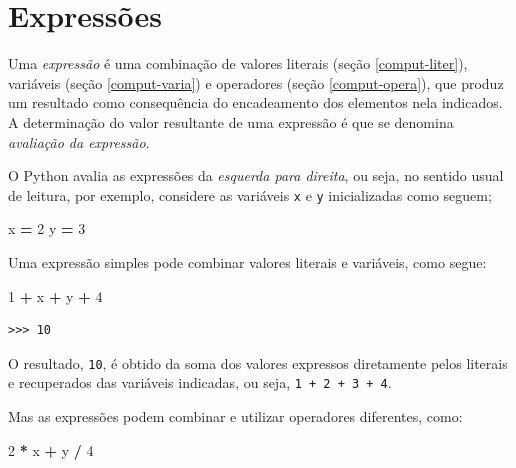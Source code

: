\documentclass[
]{book}
\newenvironment{Shaded}{\begin{snugshade}}{\end{snugshade}}
\newcommand{\DecValTok}[1]{\textcolor[rgb]{0.00,0.00,0.81}{#1}}
\newcommand{\NormalTok}[1]{#1}
\newcommand{\OperatorTok}[1]{\textcolor[rgb]{0.81,0.36,0.00}{\textbf{#1}}}
\begin{document}
\hypertarget{comput-expre}{%
\section{Expressões}\label{comput-expre}}

Uma \emph{expressão} é uma combinação de valores literais (seção \ref{comput-liter}), variáveis (seção \ref{comput-varia}) e operadores (seção \ref{comput-opera}), que produz um resultado como consequência do encadeamento dos elementos nela indicados. A determinação do valor resultante de uma expressão é que se denomina \emph{avaliação da expressão}.

O Python avalia as expressões da \emph{esquerda para direita}, ou seja, no sentido usual de leitura, por exemplo, considere as variáveis \texttt{x} e \texttt{y} inicializadas como seguem;

\begin{Shaded}
\begin{Highlighting}[]
\NormalTok{x }\OperatorTok{=} \DecValTok{2}
\NormalTok{y }\OperatorTok{=} \DecValTok{3}
\end{Highlighting}
\end{Shaded}

Uma expressão simples pode combinar valores literais e variáveis, como segue:

\begin{Shaded}
\begin{Highlighting}[]
\DecValTok{1} \OperatorTok{+}\NormalTok{ x }\OperatorTok{+}\NormalTok{ y }\OperatorTok{+} \DecValTok{4}
\end{Highlighting}
\end{Shaded}

\begin{verbatim}
>>> 10
\end{verbatim}

O resultado, \texttt{10}, é obtido da soma dos valores expressos diretamente pelos literais e recuperados das variáveis indicadas, ou seja, \texttt{1\ +\ 2\ +\ 3\ +\ 4}.

Mas as expressões podem combinar e utilizar operadores diferentes, como:

\begin{Shaded}
\begin{Highlighting}[]
\DecValTok{2} \OperatorTok{*}\NormalTok{ x }\OperatorTok{+}\NormalTok{  y }\OperatorTok{/} \DecValTok{4}
\end{Highlighting}
\end{Shaded}
\end{document}
